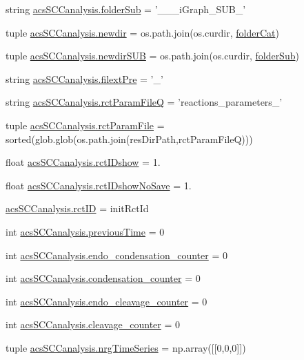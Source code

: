 \begin{DoxyCompactItemize}
string \hyperlink{a00128_a90c2bcabbdb271c2c3347ebea4c259bc}{acs\-S\-C\-Canalysis.\-folder\-Sub} = '\-\_\-\-\_\-\_\-i\-Graph\-\_\-\-S\-U\-B\-\_\-'
\item 
tuple \hyperlink{a00128_a440179ca1c764cabcf9181985ae5dfb8}{acs\-S\-C\-Canalysis.\-newdir} = os.\-path.\-join(os.\-curdir, \hyperlink{a00028_ac4793cb55101110d228ded89ce9caa48}{folder\-Cat})
\item 
tuple \hyperlink{a00128_adb3b62d0896774bc87adfee19d047aa8}{acs\-S\-C\-Canalysis.\-newdir\-S\-U\-B} = os.\-path.\-join(os.\-curdir, \hyperlink{a00028_a05c5bf0305e5d58d4dc25bd89a025678}{folder\-Sub})
\item 
string \hyperlink{a00128_a60ff937c050eef601bd84134d1913d8a}{acs\-S\-C\-Canalysis.\-filext\-Pre} = '\-\_\-'
\item 
string \hyperlink{a00128_aff5ea475bb2c78122a231a915dc88e89}{acs\-S\-C\-Canalysis.\-rct\-Param\-File\-Q} = 'reactions\-\_\-parameters\-\_\-'
\item 
tuple \hyperlink{a00128_ac700504fc38d7684ec9fae104d7d90a3}{acs\-S\-C\-Canalysis.\-rct\-Param\-File} = sorted(glob.\-glob(os.\-path.\-join(res\-Dir\-Path,rct\-Param\-File\-Q)))
\item 
float \hyperlink{a00128_a8a780c7762bc8a40f296abfd474b7ce4}{acs\-S\-C\-Canalysis.\-rct\-I\-Dshow} = 1.
\item 
float \hyperlink{a00128_a3942b0b71d5893c244f7f49929db336b}{acs\-S\-C\-Canalysis.\-rct\-I\-Dshow\-No\-Save} = 1.
\item 
\hyperlink{a00128_a78ffc7d3b69c53ec5389a151e7fdcb83}{acs\-S\-C\-Canalysis.\-rct\-I\-D} = init\-Rct\-Id
\item 
int \hyperlink{a00128_aff96a31e98ac46cb47a67b74f5d87351}{acs\-S\-C\-Canalysis.\-previous\-Time} = 0
\item 
int \hyperlink{a00128_a20a51ec68106a5a97fb3a72f417ca4e6}{acs\-S\-C\-Canalysis.\-endo\-\_\-condensation\-\_\-counter} = 0
\item 
int \hyperlink{a00128_a144441bdbe6e835849cf165ea2946848}{acs\-S\-C\-Canalysis.\-condensation\-\_\-counter} = 0
\item 
int \hyperlink{a00128_af5702a39b502da88dde8c38417a0efbd}{acs\-S\-C\-Canalysis.\-endo\-\_\-cleavage\-\_\-counter} = 0
\item 
int \hyperlink{a00128_a0dd6730b063ac11ae4620c4a0778f6d9}{acs\-S\-C\-Canalysis.\-cleavage\-\_\-counter} = 0
\item 
tuple \hyperlink{a00128_ad4d4abc783f2f7f8d1084b1144b4fe2f}{acs\-S\-C\-Canalysis.\-nrg\-Time\-Series} = np.\-array(\mbox{[}\mbox{[}0,0,0\mbox{]}\mbox{]})

\end{DoxyCompactItemize}
